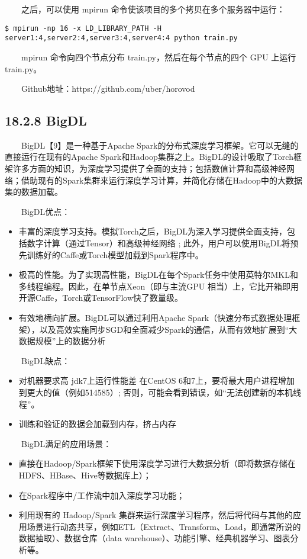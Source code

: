   之后，可以使用 mpirun 命令使该项目的多个拷贝在多个服务器中运行：

\begin{verbatim}
$ mpirun -np 16 -x LD_LIBRARY_PATH -H 
server1:4,server2:4,server3:4,server4:4 python train.py
\end{verbatim}

  mpirun 命令向四个节点分布 train.py，然后在每个节点的四个 GPU 上运行
train.py。

  Github地址：https://github.com/uber/horovod

\subsection{18.2.8 BigDL}\label{bigdl}

  BigDL【9】是一种基于Apache
Spark的分布式深度学习框架。它可以无缝的直接运行在现有的Apache
Spark和Hadoop集群之上。BigDL的设计吸取了Torch框架许多方面的知识，为深度学习提供了全面的支持；包括数值计算和高级神经网络；借助现有的Spark集群来运行深度学习计算，并简化存储在Hadoop中的大数据集的数据加载。

  BigDL优点：

\begin{itemize}
\item
  丰富的深度学习支持。模拟Torch之后，BigDL为深入学习提供全面支持，包括数字计算（通过Tensor）和高级神经网络
  ;
  此外，用户可以使用BigDL将预先训练好的Caffe或Torch模型加载到Spark程序中。
\item
  极高的性能。为了实现高性能，BigDL在每个Spark任务中使用英特尔MKL和多线程编程。因此，在单节点Xeon（即与主流GPU
  相当）上，它比开箱即用开源Caffe，Torch或TensorFlow快了数量级。
\item
  有效地横向扩展。BigDL可以通过利用Apache
  Spark（快速分布式数据处理框架），以及高效实施同步SGD和全面减少Spark的通信，从而有效地扩展到``大数据规模''上的数据分析
\end{itemize}

  BigDL缺点：

\begin{itemize}
\item
  对机器要求高 jdk7上运行性能差 在CentOS
  6和7上，要将最大用户进程增加到更大的值（例如514585）;
  否则，可能会看到错误，如``无法创建新的本机线程''。
\item
  训练和验证的数据会加载到内存，挤占内存
\end{itemize}

  BigDL满足的应用场景：

\begin{itemize}
\item
  直接在Hadoop/Spark框架下使用深度学习进行大数据分析（即将数据存储在HDFS、HBase、Hive等数据库上）；
\item
  在Spark程序中/工作流中加入深度学习功能；
\item
  利用现有的 Hadoop/Spark
  集群来运行深度学习程序，然后将代码与其他的应用场景进行动态共享，例如ETL（Extract、Transform、Load，即通常所说的数据抽取）、数据仓库（data
  warehouse）、功能引擎、经典机器学习、图表分析等。
\end{itemize}

